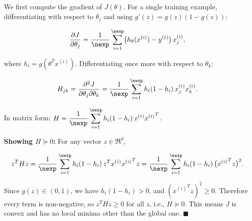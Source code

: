 \begin{answer}
We first compute the gradient of $J(\theta)$. For a single training example, differentiating with respect to $\theta_j$ and using $g'(z) = g(z)(1-g(z))$:

\[
\frac{\partial J}{\partial \theta_j} = \frac{1}{\nexp} \sum_{i=1}^{\nexp} \bigl(h_\theta(x^{(i)}) - y^{(i)}\bigr)\, x_j^{(i)},
\]

where $h_i = g(\theta^T x^{(i)})$. Differentiating once more with respect to $\theta_k$:

\[
H_{jk} = \frac{\partial^2 J}{\partial \theta_j \partial \theta_k}
= \frac{1}{\nexp} \sum_{i=1}^{\nexp} h_i(1-h_i)\, x_j^{(i)} x_k^{(i)}.
\]

In matrix form: $\displaystyle H = \frac{1}{\nexp} \sum_{i=1}^{\nexp} h_i(1-h_i)\, x^{(i)}{x^{(i)}}^T$.

\medskip
\textbf{Showing $H \succeq 0$:} For any vector $z \in \Re^d$,

\[
z^T H z
= \frac{1}{\nexp} \sum_{i=1}^{\nexp} h_i(1-h_i)\, z^T x^{(i)}{x^{(i)}}^T z
= \frac{1}{\nexp} \sum_{i=1}^{\nexp} h_i(1-h_i)\, \bigl({x^{(i)}}^T z\bigr)^2.
\]

Since $g(z) \in (0,1)$, we have $h_i(1-h_i) > 0$, and $({x^{(i)}}^T z)^2 \ge 0$. Therefore every term is non-negative, so $z^T H z \ge 0$ for all $z$, i.e., $H \succeq 0$. This means $J$ is convex and has no local minima other than the global one. $\blacksquare$
\end{answer}
